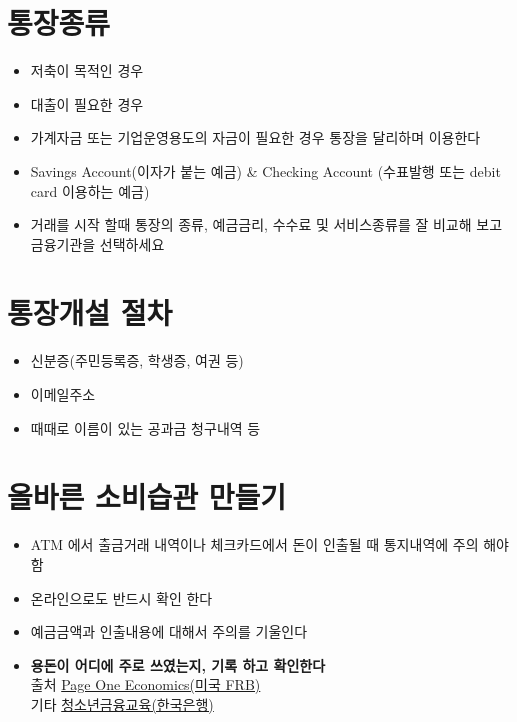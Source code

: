 \documentclass[
]{book}
\providecommand{\tightlist}{%
  \setlength{\itemsep}{0pt}\setlength{\parskip}{0pt}}
\begin{document}
\hypertarget{uxd1b5uxc7a5uxc885uxb958}{%
\section{통장종류}\label{uxd1b5uxc7a5uxc885uxb958}}

\begin{itemize}
\tightlist
\item
  저축이 목적인 경우
\item
  대출이 필요한 경우
\item
  가계자금 또는 기업운영용도의 자금이 필요한 경우 통장을 달리하며 이용한다
\item
  Savings Account(이자가 붙는 예금) \& Checking Account (수표발행 또는 debit card 이용하는 예금)
\item
  거래를 시작 할때 통장의 종류, 예금금리, 수수료 및 서비스종류를 잘 비교해 보고 금융기관을 선택하세요
\end{itemize}

\hypertarget{uxd1b5uxc7a5uxac1cuxc124-uxc808uxcc28}{%
\section{통장개설 절차}\label{uxd1b5uxc7a5uxac1cuxc124-uxc808uxcc28}}

\begin{itemize}
\tightlist
\item
  신분증(주민등록증, 학생증, 여권 등)
\item
  이메일주소
\item
  때때로 이름이 있는 공과금 청구내역 등
\end{itemize}

\hypertarget{uxc62cuxbc14uxb978-uxc18cuxbe44uxc2b5uxad00-uxb9ccuxb4e4uxae30}{%
\section{올바른 소비습관 만들기}\label{uxc62cuxbc14uxb978-uxc18cuxbe44uxc2b5uxad00-uxb9ccuxb4e4uxae30}}

\begin{itemize}
\tightlist
\item
  ATM 에서 출금거래 내역이나 체크카드에서 돈이 인출될 때 통지내역에 주의 해야 함\\
\item
  온라인으로도 반드시 확인 한다\\
\item
  예금금액과 인출내용에 대해서 주의를 기울인다\\
\item
  \textbf{용돈이 어디에 주로 쓰였는지, 기록 하고 확인한다}
  \\
  출처 \href{https://research.stlouisfed.org/publications/page1-econ/2020/10/01/banking-basics}{Page One Economics(미국 FRB)}\\
  기타 \href{http://www.bok.or.kr/portal/main/contents.do?menuNo=201040}{청소년금융교육(한국은행)}
\end{itemize}
\end{document}
